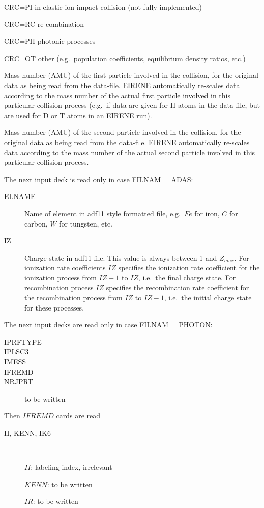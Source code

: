 \begin{description}
        CRC=PI in-elastic ion impact collision (not fully implemented)

        CRC=RC re-combination 

        CRC=PH photonic processes 

        CRC=OT other  (e.g.\ population coefficients, equilibrium density ratios, etc.)
  \item[MASSP] Mass number (\ac{AMU}) of the first particle involved in the
        collision, for the original data as being read from the data-file.
        EIRENE automatically re-scales data according to the mass number of the actual
        first particle involved in this particular collision process (e.g.\ if data are
        given for H atoms in the data-file, but are used for D or T atoms in an EIRENE
        run).
  \item[MASST] Mass number (\ac{AMU}) of the second particle involved in the
        collision, for the original data as being read from the data-file.
        EIRENE automatically re-scales data according to the mass number of the actual
        second particle involved in this particular collision process.
\end{description}
The next input deck is read only in case FILNAM = ADAS:
\begin{description}
  \item[ELNAME] Name of element in adf11 style formatted file, e.g.\ $Fe$ for
        iron, $C$ for carbon, $W$ for tungsten, etc.
  \item[IZ] Charge state in adf11
        file.
        This value is always between 1 and $Z_{max}$.
        For ionization rate coefficients $IZ$ specifies the ionization rate coefficient
        for the ionization process from $IZ-1$ to $IZ$, i.e.\ the final charge state.
        For recombination process $IZ$ specifies the recombination rate coefficient for
        the recombination process from $IZ$ to $IZ-1$, i.e.\ the initial charge state
        for these processes.
\end{description}
The next input decks are read only in case FILNAM = PHOTON:
\begin{description}
  \item[IPRFTYPE]
  \item[IPLSC3]
  \item[IMESS]
  \item[IFREMD]
  \item[NRJPRT] to be
        written
\end{description}
Then $IFREMD$ cards are read
\begin{description}
  \item[II, KENN,  IK6] ~ 

        $II$: labeling index, irrelevant 

        $KENN$: to be written 

        $IR$: to be written
\end{description}

